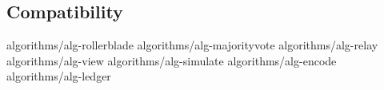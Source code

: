 \subsection{Compatibility}\label{sec:compatibility}

{algorithms/alg-rollerblade}
{algorithms/alg-majorityvote}
{algorithms/alg-relay}
{algorithms/alg-view}
{algorithms/alg-simulate}
{algorithms/alg-encode}
{algorithms/alg-ledger}
